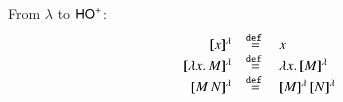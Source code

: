 
From $\lambda$ to $\mathsf{HO}^{+}$:
\[
	\begin{array}{rcl}
		\pmap{x}{\lambda} &\defeq& x\\
		\pmap{\abs{x}{M}}{\lambda} &\defeq& \abs{x}{\pmap{M}{\lambda}}\\
		\pmap{\appl{M}{N}}{\lambda} &\defeq& \appl{\pmap{M}{\lambda}}{\pmap{N}{\lambda}}\\
	\end{array}
\]
